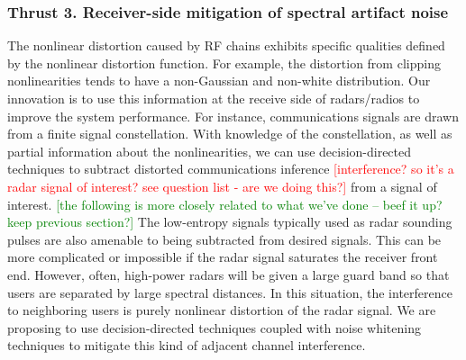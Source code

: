 \subsubsection{Thrust 3.  Receiver-side mitigation of spectral artifact noise}
The nonlinear distortion caused by RF chains exhibits specific qualities defined by the nonlinear distortion function.  For example, the distortion from clipping nonlinearities tends to have a non-Gaussian and non-white distribution.  Our innovation is to use this information at the receive side of radars/radios to improve the system performance.  For instance, communications signals are drawn from a finite signal constellation.  With knowledge of the constellation, as well as partial information about the nonlinearities, we can use decision-directed techniques to subtract distorted communications inference \textcolor{red}{[interference?  so it's a radar signal of interest?  see question list - are we doing this?]} from a signal of interest.  \textcolor{green}{[the following is more closely related to what we've done -- beef it up?  keep previous section?]}
The low-entropy signals typically used as radar sounding pulses are also amenable to being subtracted from desired signals. This can be more complicated or impossible if the radar signal saturates the receiver front end.  However, often, high-power radars will be given a large guard band so that users are separated by large spectral distances.  In this situation, the interference to neighboring users is purely nonlinear distortion of the radar signal.  We are proposing to use decision-directed techniques coupled with noise whitening techniques to mitigate this kind of adjacent channel interference.
